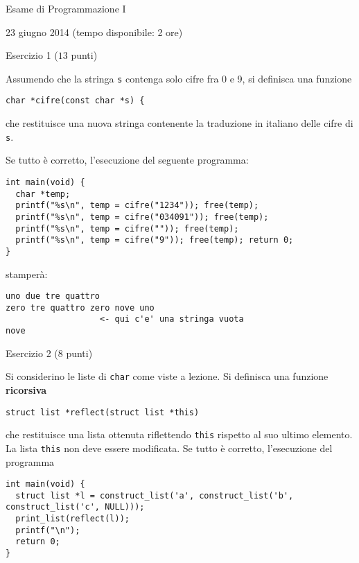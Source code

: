 \documentclass[12pt]{article}
\begin{document}
\begin{center}{\LARGE Esame di Programmazione I}\\
\vspace*{-3ex}
\begin{center}
  \large 23 giugno 2014 (tempo disponibile: 2 ore)
\end{center}
\end{center}
\begin{center}{\Large Esercizio 1} ($13$ punti)
\end{center}
Assumendo che la stringa \texttt{s} contenga solo cifre fra 0 e 9,
si definisca una funzione
%
\begin{verbatim}
char *cifre(const char *s) {
\end{verbatim}
%
che restituisce una nuova stringa contenente la traduzione in italiano
delle cifre di \texttt{s}.

Se tutto \`e corretto, l'esecuzione del seguente programma:

{\scriptsize
\begin{verbatim}
int main(void) {
  char *temp;
  printf("%s\n", temp = cifre("1234")); free(temp);
  printf("%s\n", temp = cifre("034091")); free(temp);
  printf("%s\n", temp = cifre("")); free(temp);
  printf("%s\n", temp = cifre("9")); free(temp); return 0;
}
\end{verbatim}}

\noindent
stamper\`a:
%
{\scriptsize
\begin{verbatim}
uno due tre quattro
zero tre quattro zero nove uno
                   <- qui c'e' una stringa vuota
nove
\end{verbatim}}

\begin{center}{\Large Esercizio 2} ($8$ punti)\end{center}
%
Si considerino le liste di \texttt{char} come viste a lezione. Si definisca una funzione \textbf{ricorsiva}
%
\begin{verbatim}
struct list *reflect(struct list *this)
\end{verbatim}
%
che restituisce una lista ottenuta riflettendo \texttt{this} rispetto
al suo ultimo elemento. La lista \texttt{this} non deve essere modificata.
Se tutto \`e corretto, l'esecuzione del programma

{\scriptsize
\begin{verbatim}
int main(void) {
  struct list *l = construct_list('a', construct_list('b', construct_list('c', NULL)));
  print_list(reflect(l));
  printf("\n");
  return 0;
}
\end{verbatim}}
\end{document}
